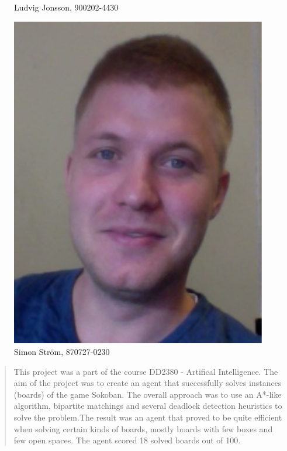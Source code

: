\documentclass[article,11pt]{article}
\begin{document}
\begin{table}[ht]
\begin{tabular}[r]
\begin{figure}[h]
\caption{Ludvig Jonsson, 900202-4430}
\end{figure}
\begin{figure}[h]
\includegraphics[scale=0.4]{sten.pdf}
\caption{Simon Ström, 870727-0230}
\end{figure}
\end{tabular}
\end{table}
\newpage

\pagestyle{plain}

\begin{abstract}
This project was a part of the course DD2380 - Artifical
Intelligence. The aim of the project was to create an agent that
successfully solves instances (boards) of the game Sokoban. The
overall approach was to use an A*-like algorithm, bipartite matchings
and several deadlock detection heuristics to solve the problem.The
result was an agent that proved to be quite efficient when solving
certain kinds of boards, mostly boards with few boxes and few open
spaces. The agent scored 18 solved boards out of 100.
\end{abstract}
\end{document}
